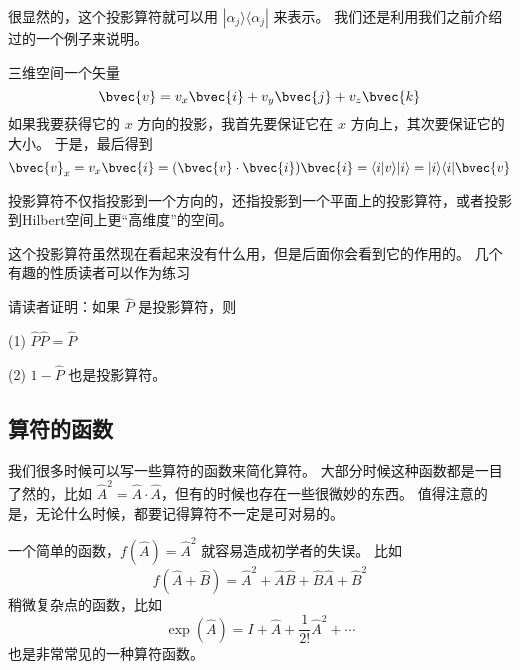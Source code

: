 很显然的，这个投影算符就可以用 $|\alpha_j\rangle\langle\alpha_j|$ 来表示。 我们还是利用我们之前介绍过的一个例子来说明。

\begin{example}{}
三维空间一个矢量
\begin{equation}
\bvec{v} = v_x\bvec{i} + v_y\bvec{j} + v_z \bvec{k}
\end{equation}
如果我要获得它的 $x$ 方向的投影，我首先要保证它在 $x$ 方向上，其次要保证它的大小。 于是，最后得到
\begin{equation}
\bvec{v}_x = v_x\bvec{i} = (\bvec{v}\cdot\bvec{i})\bvec{i} = \langle i|v\rangle |i\rangle = |i\rangle\langle i| \bvec{v}
\end{equation}
\end{example}

投影算符不仅指投影到一个方向的，还指投影到一个平面上的投影算符，或者投影到Hilbert空间上更“高维度”的空间。

这个投影算符虽然现在看起来没有什么用，但是后面你会看到它的作用的。 几个有趣的性质读者可以作为练习

\begin{exercise}{}
请读者证明：如果 $\hat{P}$ 是投影算符，则

(1) $\hat{P}\hat{P} = \hat{P}$

(2) $1-\hat{P}$ 也是投影算符。
\end{exercise}

\subsection{算符的函数}

我们很多时候可以写一些算符的函数来简化算符。 大部分时候这种函数都是一目了然的，比如 $\hat{A}^2 = \hat{A}\cdot\hat{A}$，但有的时候也存在一些很微妙的东西。 值得注意的是，无论什么时候，都要记得算符不一定是可对易的。

一个简单的函数，$f(\hat{A}) = \hat{A}^2$ 就容易造成初学者的失误。 比如
\begin{equation}
f(\hat{A}+\hat{B}) = \hat{A}^2 + \hat{A}\hat{B} + \hat{B}\hat{A} + \hat{B}^2
\end{equation}
稍微复杂点的函数，比如
\begin{equation}
\exp(\hat{A}) = I + \hat{A} + \frac{1}{2!}\hat{A}^2 + \cdots
\end{equation}
也是非常常见的一种算符函数。

